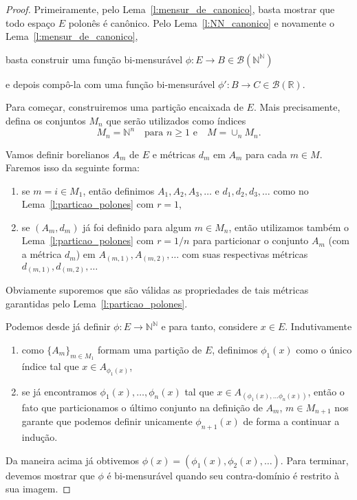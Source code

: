 \begin{proof}
  Primeiramente, pelo Lema~\ref{l:mensur_de_canonico}, basta mostrar que todo espaço $E$ polonês é canônico.
  Pelo Lema~\ref{l:NN_canonico} e novamente o Lema~\ref{l:mensur_de_canonico},
  \begin{display}
    basta construir uma função bi-mensurável $\phi:E \to B \in \mathcal{B}(\mathbb{N}^\mathbb{N})$
  \end{display}
  e depois compô-la com uma função bi-mensurável $\phi': B \to C \in \mathcal{B}(\mathbb{R})$.

  Para começar, construiremos uma partição encaixada de $E$.
  Mais precisamente, defina os conjuntos $M_n$ que serão utilizados como índices
  \begin{equation}
    M_n = \mathbb{N}^n \quad \text{para $n \geq 1$ e} \quad M = \cup_n M_n.
  \end{equation}

  Vamos definir borelianos $A_m$ de $E$ e métricas $d_m$ em $A_m$ para cada $m \in M$.
  Faremos isso da seguinte forma:
  \begin{enumerate}[\quad a)]
  \item se $m = i \in M_1$, então definimos $A_1, A_2, A_3, \dots$ e $d_1, d_2, d_3, \dots$ como no Lema~\ref{l:particao_polones} com $r = 1$,
  \item se $(A_m, d_m)$ já foi definido para algum $m \in M_n$, então utilizamos também o Lema~\ref{l:particao_polones} com $r = 1/n$ para particionar o conjunto $A_m$ (com a métrica $d_m$) em $A_{(m,1)}, A_{(m,2)}, \dots$ com suas respectivas métricas $d_{(m,1)}, d_{(m,2)}, \dots$
  \end{enumerate}
  Obviamente suporemos que são válidas as propriedades de tais métricas garantidas pelo Lema~\ref{l:particao_polones}.

  Podemos desde já definir $\phi:E \to \mathbb{N}^\mathbb{N}$ e para tanto, considere $x \in E$.
  Indutivamente
  \begin{enumerate}[\quad a)]
  \item como $\{A_m\}_{m \in M_1}$ formam uma partição de $E$, definimos $\phi_1(x)$ como o único índice tal que $x \in A_{\phi_1(x)}$,
  \item se já encontramos $\phi_1(x), \dots, \phi_n(x)$ tal que $x \in A_{(\phi_1(x), \dots \phi_n(x))}$, então o fato que particionamos o último conjunto na definição de $A_m$, $m \in M_{n+1}$ nos garante que podemos definir unicamente $\phi_{n+1}(x)$ de forma a continuar a indução.
  \end{enumerate}
  Da maneira acima já obtivemos $\phi(x) = (\phi_1(x), \phi_2(x), \dots)$.
  Para terminar, devemos mostrar que $\phi$ é bi-mensurável quando seu contra-domínio é restrito à sua imagem.


\end{proof}
